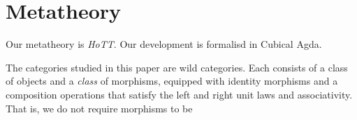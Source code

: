\section{Metatheory}
\label{sec:metatheory}

Our metatheory is \emph{HoTT}. Our development is formalisd in Cubical Agda.

The categories studied in this paper are wild categories. Each consists of a
class of objects and a \emph{class} of morphisms, equipped with identity
morphisms and a composition operations that satisfy the left and right unit laws
and associativity. That is, we do not require morphisms to be 
